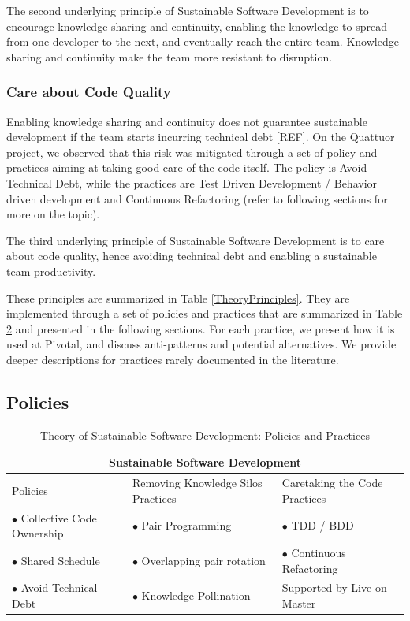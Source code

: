 \begin{table}[]
The second underlying principle of Sustainable Software Development is to encourage knowledge sharing and continuity, enabling the knowledge to spread from one developer to the next, and eventually reach the entire team. Knowledge sharing and continuity make the team more resistant to disruption. 

\subsubsection{Care about Code Quality}

Enabling knowledge sharing and continuity does not guarantee sustainable development if the team starts incurring technical debt [REF]. On the Quattuor project, we observed that this risk was mitigated through a set of policy and practices aiming at taking good care of the code itself. The policy is Avoid Technical Debt, while the practices are Test Driven Development / Behavior driven development and Continuous Refactoring (refer to following sections for more on the topic).

The third underlying principle of Sustainable Software Development is to care about code quality, hence avoiding technical debt and enabling a sustainable team productivity.

These principles are summarized in Table \ref{TheoryPrinciples}. They are implemented through a set of policies and practices that are summarized in Table \ref{TheoryPractices} and presented in the following sections. For each practice, we present how it is used at Pivotal, and discuss anti-patterns and potential alternatives. We provide deeper descriptions for practices rarely documented in the literature.
\subsection{Policies}

\begin{table}[]
\renewcommand{\arraystretch}{1.5}
\centering
\caption{Theory of Sustainable Software Development: Policies and Practices}
\label{TheoryPractices}
\begin{tabular}{l|l|l}
\hline
\multicolumn{3}{c}{Sustainable Software Development}                               \\
\hline
Policies                  & Removing Knowledge Silos Practices & Caretaking the Code Practices         \\
$\bullet$ Collective Code Ownership & $\bullet$ Pair Programming         & $\bullet$  TDD / BDD                   \\
$\bullet$ Shared Schedule           & $\bullet$ Overlapping pair rotation & $\bullet$ Continuous Refactoring      \\
$\bullet$ Avoid Technical Debt      & $\bullet$  Knowledge Pollination    & Supported by Live on Master \\ 
\hline
\end{tabular}
\end{table}


\end{table}
